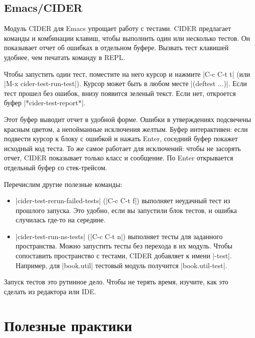 
\subsection{Emacs/CIDER}

Модуль CIDER для Emacs упрощает
работу с тестами. CIDER предлагает команды и комбинации клавиш, чтобы выполнить
один или несколько тестов. Он показывает отчет об ошибках в отдельном
буфере. Вызвать тест клавишей удобнее, чем печатать команду в REPL.

Чтобы запустить один тест, поместите на него курсор и нажмите \spverb|C-c C-t t|
(или \spverb|M-x cider-test-run-test|). Курсор может быть в любом месте
\spverb|(deftest ...)|. Если тест прошел без ошибок, внизу появится зеленый
текст. Если нет, откроется буфер \spverb|*cider-test-report*|.

Этот буфер выводит отчет в удобной форме. Ошибки в утверждениях подсвечены
красным цветом, а непойманные исключения желтым. Буфер интерактивен: если
подвести курсор к блоку с ошибкой и нажать Enter, соседний буфер покажет
исходный код теста. То же самое работает для исключений: чтобы не засорять
отчет, CIDER показывает только класс и сообщение. По Enter открывается отдельный
буфер со стек-трейсом.

Перечислим другие полезные команды:

\begin{itemize}

\item
  \spverb|cider-test-rerun-failed-tests| (\spverb|C-c C-t f|) выполняет
  неудачный тест из прошлого запуска. Это удобно, если вы запустили блок тестов,
  и ошибка случилась где-то на середине.

\item
  \spverb|cider-test-run-ns-tests| (\spverb|C-c C-t n|) выполняет тесты для
  заданного пространства. Можно запустить тесты без перехода в их модуль. Чтобы
  сопоставить пространство с тестами, CIDER добавляет к имени
  \spverb|-test|. Например, для \spverb|book.util| тестовый модуль получится
  \spverb|book.util-test|.

\end{itemize}

Запуск тестов это рутинное дело. Чтобы не терять время, изучите, как это сделать
из редактора или IDE.

\section{Полезные практики}

